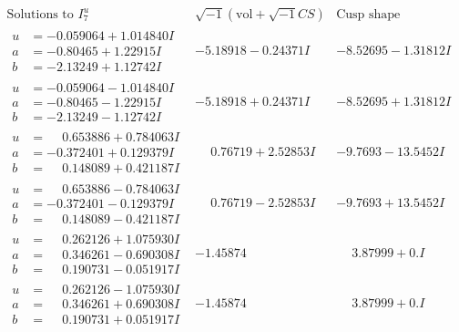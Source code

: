 \documentclass[1p]{elsarticle_modified}
\theoremstyle{definition}
\newcommand{\I}{\sqrt{-1}}
\begin{document}
$$\begin{array}{c|c|c}  
\text{Solutions to }I^u_{7}& \I (\text{vol} + \sqrt{-1}CS) & \text{Cusp shape}\\
 \hline 
\begin{aligned}
u &= -0.059064 + 1.014840 I \\
a &= -0.80465 + 1.22915 I \\
b &= -2.13249 + 1.12742 I\end{aligned}
 & -5.18918 - 0.24371 I & -8.52695 - 1.31812 I \\ \hline\begin{aligned}
u &= -0.059064 - 1.014840 I \\
a &= -0.80465 - 1.22915 I \\
b &= -2.13249 - 1.12742 I\end{aligned}
 & -5.18918 + 0.24371 I & -8.52695 + 1.31812 I \\ \hline\begin{aligned}
u &= \phantom{-}0.653886 + 0.784063 I \\
a &= -0.372401 + 0.129379 I \\
b &= \phantom{-}0.148089 + 0.421187 I\end{aligned}
 & \phantom{-}0.76719 + 2.52853 I & -9.7693 - 13.5452 I \\ \hline\begin{aligned}
u &= \phantom{-}0.653886 - 0.784063 I \\
a &= -0.372401 - 0.129379 I \\
b &= \phantom{-}0.148089 - 0.421187 I\end{aligned}
 & \phantom{-}0.76719 - 2.52853 I & -9.7693 + 13.5452 I \\ \hline\begin{aligned}
u &= \phantom{-}0.262126 + 1.075930 I \\
a &= \phantom{-}0.346261 - 0.690308 I \\
b &= \phantom{-}0.190731 - 0.051917 I\end{aligned}
 & -1.45874\phantom{ +0.000000I} & \phantom{-}3.87999 + 0. I\phantom{ +0.000000I} \\ \hline\begin{aligned}
u &= \phantom{-}0.262126 - 1.075930 I \\
a &= \phantom{-}0.346261 + 0.690308 I \\
b &= \phantom{-}0.190731 + 0.051917 I\end{aligned}
 & -1.45874\phantom{ +0.000000I} & \phantom{-}3.87999 + 0. I\phantom{ +0.000000I} \\ \hline\begin{aligned}

\end{aligned}
\end{array}$$
\end{document}
